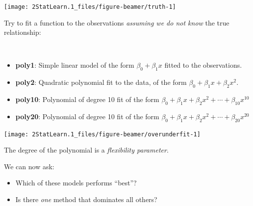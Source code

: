 \documentclass[
  ignorenonframetext,
]{beamer}
\providecommand{\tightlist}{%
  \setlength{\itemsep}{0pt}\setlength{\parskip}{0pt}}
\begin{document}
\begin{frame}
\begin{center}\texttt{[image: 2StatLearn.1\_files/figure-beamer/truth-1]} \end{center}
\end{frame}

\begin{frame}
Try to fit a function to the observations \emph{assuming we do not know}
the true relationship:

\(~\)

\begin{itemize}
\tightlist
\item
  \textbf{poly1}: Simple linear model of the form \(\beta_0+\beta_1 x\)
  fitted to the observations.
\end{itemize}

\begin{itemize}
\tightlist
\item
  \textbf{poly2}: Quadratic polynomial fit to the data, of the form
  \(\beta_0+\beta_1 x +\beta_2 x^2\).
\end{itemize}

\begin{itemize}
\tightlist
\item
  \textbf{poly10}: Polynomial of degree 10 fit of the form
  \(\beta_0+\beta_1 x +\beta_2 x^2+\cdots +\beta_{10}x^{10}\)
\end{itemize}

\begin{itemize}
\tightlist
\item
  \textbf{poly20}: Polynomial of degree 10 fit of the form
  \(\beta_0+\beta_1 x +\beta_2 x^2+\cdots +\beta_{20}x^{20}\)
\end{itemize}
\end{frame}

\begin{frame}
\begin{center}\texttt{[image: 2StatLearn.1\_files/figure-beamer/overunderfit-1]} \end{center}

The degree of the polynomial is a \emph{flexibility parameter}.
\end{frame}

\begin{frame}
We can now ask:

\begin{itemize}
\item
  Which of these models performs ``best''?
\item
  Is there \emph{one} method that dominates all others?
\end{itemize}
\end{frame}
\end{document}
